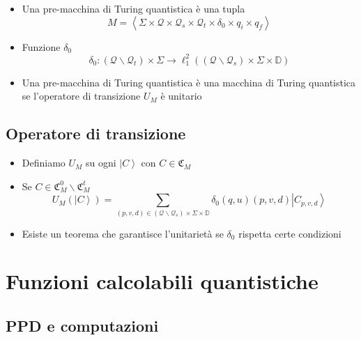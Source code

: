 \documentclass{beamer}
\begin{document}
\begin{frame}{\subsecname}{}
	\begin{itemize}
		\item Una pre-macchina di Turing quantistica è una tupla
		\[ M = \left \langle \Sigma \times \mathcal{Q} \times \mathcal{Q}_{s} \times \mathcal{Q}_{t} \times \delta_{0} \times q_{i} \times q_{f} \right \rangle \]
		\item Funzione \(\delta_{0}\)
		\[ \delta_{0} : \left ( \mathcal{Q} \backslash \mathcal{Q}_{t} \right ) \times \Sigma \rightarrow \ell^{2}_{1} \left ( \left ( \mathcal{Q} \backslash \mathcal{Q}_{s} \right ) \times \Sigma \times \mathbb{D} \right ) \]
		\item Una pre-macchina di Turing quantistica è una macchina di Turing quantistica se l'operatore di transizione \( U_{M} \) è unitario
	\end{itemize}
\end{frame}

\subsection{Operatore di transizione}

\begin{frame}{\subsecname}{}
	\begin{itemize}
		\item Definiamo \( U_{M} \) su ogni \(\left | C \right \rangle \) con \( C \in \mathfrak{C}_M \)
		\item Se \( C \in \mathfrak{C}^{0}_M \backslash \mathfrak{C}^{t}_M \)
		\[ U_{M} \left ( \left | C \right \rangle \right ) =
		\sum_{\left (p,v,d \right ) \in \left ( \mathcal{Q} \backslash \mathcal{Q}_{s} \right ) \times \Sigma \times \mathbb{D}}
		\delta_{0}(q, u)(p, v, d) \left | C_{p,v,d} \right \rangle \]
		\item Esiste un teorema che garantisce l'unitarietà se \(\delta_{0}\) rispetta certe condizioni
	\end{itemize}
\end{frame}

\section{Funzioni calcolabili quantistiche}

\subsection{PPD e computazioni}
\end{document}
